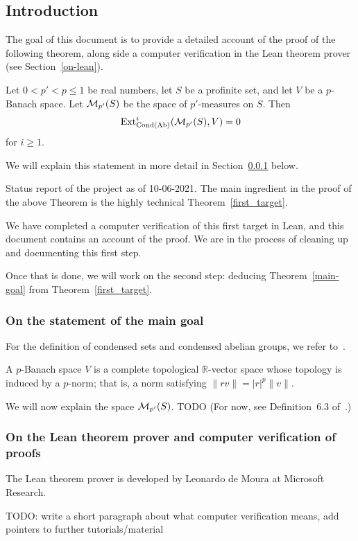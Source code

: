 \subsection*{Introduction}
\label{intro}

The goal of this document is to provide a detailed account
of the proof of the following theorem,
along side a computer verification in the Lean theorem prover
(see Section~\ref{on-lean}).

\begin{theoremx}
  \label{main-goal}
  Let $0 < p' < p \le 1$ be real numbers,
  let $S$ be a profinite set,
  and let $V$ be a $p$-Banach space.
  Let $\mathcal M_{p'}(S)$ be the space of $p'$-measures on $S$.
  Then
  \[
    \operatorname{Ext}^i_{\operatorname{Cond}(\operatorname{Ab})}(\mathcal M_{p'}(S), V)=0
  \]
  for $i \ge 1$.
\end{theoremx}

We will explain this statement in more detail in Section~\ref{on-the-statement} below.

\begin{remarkx}
  Status report of the project as of 10-06-2021.
  The main ingredient in the proof of the above Theorem
  is the highly technical Theorem~\ref{first_target}.

  We have completed a computer verification of this first target in Lean,
  and this document contains an account of the proof.
  We are in the process of cleaning up and documenting this first step.

  Once that is done, we will work on the second step:
  deducing Theorem~\ref{main-goal} from Theorem~\ref{first_target}.
\end{remarkx}

\subsubsection{On the statement of the main goal}
\label{on-the-statement}

For the definition of condensed sets and condensed abelian groups,
we refer to~\cite{Condensed}.

A $p$-Banach space $V$ is a complete topological $\mathbb R$-vector space
whose topology is induced by a $p$-norm;
that is, a norm satisfying $\|rv\| = |r|^p\|v\|$.

We will now explain the space $\mathcal M_{p'}(S)$.
TODO
(For now, see Definition~6.3 of~\cite{Analytic}.)

\subsubsection*{On the Lean theorem prover and computer verification of proofs}
\label{on-lean}

The Lean theorem prover is developed by Leonardo de Moura
at Microsoft Research.

TODO: write a short paragraph about what computer verification means,
add pointers to further tutorials/material

